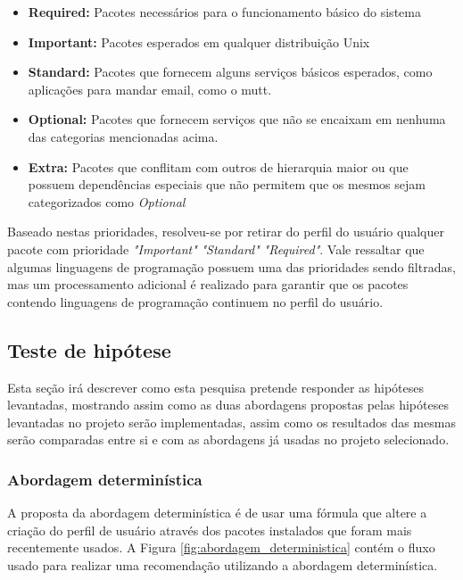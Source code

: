 \begin{itemize}
    \item \textbf{Required:} Pacotes necessários para o funcionamento básico do
        sistema
    \item \textbf{Important:} Pacotes esperados em qualquer distribuição Unix
    \item \textbf{Standard:} Pacotes que fornecem alguns serviços básicos
        esperados, como aplicações para mandar email, como o mutt.
    \item \textbf{Optional:} Pacotes que fornecem serviços que não se encaixam
        em nenhuma das categorias mencionadas acima.
    \item \textbf{Extra:} Pacotes que conflitam com outros de hierarquia maior
        ou que possuem dependências especiais que não permitem que os mesmos
        sejam categorizados como \textit{Optional}
\end{itemize}

Baseado nestas prioridades, resolveu-se por retirar do perfil do usuário
qualquer pacote com prioridade \textit{"Important"} \textit{"Standard"}
\textit{"Required"}. Vale ressaltar que algumas linguagens de programação
possuem uma das prioridades sendo filtradas, mas um processamento adicional é
realizado para garantir que os pacotes contendo linguagens de programação
continuem no perfil do usuário.

\subsection{Teste de hipótese}

Esta seção irá descrever como esta pesquisa pretende responder as hipóteses
levantadas, mostrando assim como as duas abordagens propostas pelas hipóteses
levantadas no projeto serão implementadas, assim como os resultados das mesmas
serão comparadas entre si e com as abordagens já usadas no projeto selecionado.

\subsubsection{Abordagem determinística}

A proposta da abordagem determinística é de usar uma fórmula que altere
a criação do perfil de usuário através dos pacotes instalados que foram mais
recentemente usados. A Figura \ref{fig:abordagem_deterministica}
contém o fluxo usado para realizar uma
recomendação utilizando a abordagem determinística.

